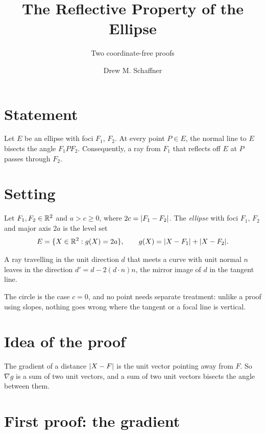 \documentclass[11pt,a4paper]{article}
\title{The Reflective Property of the Ellipse}
\subtitle{Two coordinate-free proofs}
\author{Drew M. Schaffner}
\begin{document}
\maketitle

\section{Statement}

\begin{theorem}\label{thm:main}
  Let $E$ be an ellipse with foci $F_1$, $F_2$. At every point $P \in E$, the
  normal line to $E$ bisects the angle $F_1 P F_2$. Consequently, a ray from $F_1$
  that reflects off $E$ at $P$ passes through $F_2$.
\end{theorem}

\section{Setting}

\begin{definition}[Ellipse]\label{def:ellipse}
  Let $F_1, F_2 \in \mathbb{R}^2$ and $a > c \geq 0$, where $2c = \lvert F_1 - F_2\rvert$. The
  \emph{ellipse} with foci $F_1$, $F_2$ and major axis $2a$ is the level set
  \[
    E = \{X \in \mathbb{R}^2 : g(X) = 2a\}, \qquad
    g(X) = \lvert X - F_1\rvert + \lvert X - F_2\rvert.
  \]
\end{definition}

\begin{definition}\label{def:reflection}
  A ray travelling in the unit direction $d$ that meets a curve with unit normal $n$
  leaves in the direction $d' = d - 2 (d \cdot n) n$, the mirror image of $d$ in the
  tangent line.
\end{definition}

The circle is the case $c = 0$, and no point needs separate treatment: unlike a
proof using slopes, nothing goes wrong where the tangent or a focal line is
vertical.

\section{Idea of the proof}

The gradient of a distance $\lvert X - F\rvert$ is the unit vector pointing away from $F$.
So $\nabla g$ is a sum of two unit vectors, and a sum of two unit vectors bisects the
angle between them.

\section{First proof: the gradient}
\end{document}
